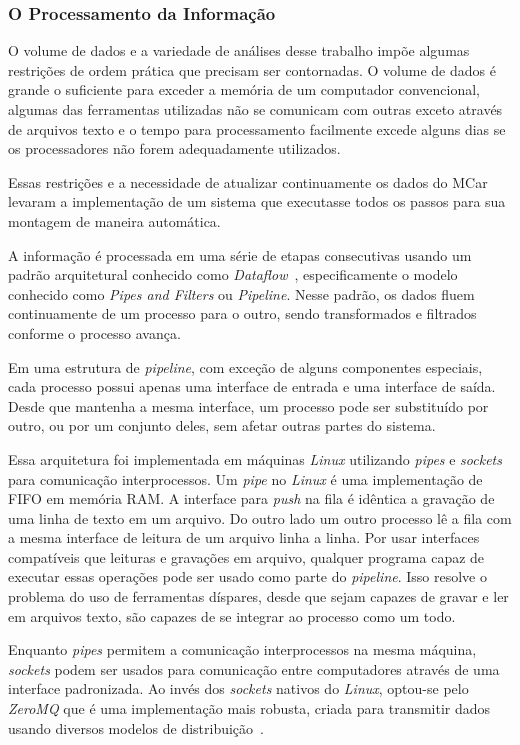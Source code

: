 \documentclass[12pt,a4paper,final]{article}
\begin{document}
\subsubsection{O Processamento da Informação}

O volume de dados e a variedade de análises desse trabalho impõe algumas restrições de ordem prática que precisam ser contornadas. O volume de dados é grande o suficiente para exceder a memória de um computador convencional, algumas das ferramentas utilizadas não se comunicam com outras exceto através de arquivos texto e o tempo para processamento facilmente excede alguns dias se os processadores não forem adequadamente utilizados.

Essas restrições e a necessidade de atualizar continuamente os dados do MCar levaram a implementação de um sistema que executasse todos os passos para sua montagem de maneira automática.

A informação é processada em uma série de etapas consecutivas usando um padrão arquitetural conhecido como \textit{Dataflow}~\cite{Carkci2014-jk, Hohpe2003-nj}, especificamente o modelo conhecido como \textit{Pipes and Filters} ou \textit{Pipeline}. Nesse padrão, os dados fluem continuamente de um processo para o outro, sendo transformados e filtrados conforme o processo avança. 

Em uma estrutura de \textit{pipeline}, com exceção de alguns componentes especiais, cada processo possui apenas uma interface de entrada e uma interface de saída. Desde que mantenha a mesma interface, um processo pode ser substituído por outro, ou por um conjunto deles, sem afetar outras partes do sistema.

Essa arquitetura foi implementada em máquinas \textit{Linux} utilizando \textit{pipes} e \textit{sockets} para comunicação interprocessos. Um \textit{pipe} no \textit{Linux} é uma implementação de FIFO em memória RAM. A interface para \textit{push} na fila é idêntica a gravação de uma linha de texto em um arquivo. Do outro lado um outro processo lê a fila com a mesma interface de leitura de um arquivo linha a linha. Por usar interfaces compatíveis que leituras e gravações em arquivo, qualquer programa capaz de executar essas operações pode ser usado como parte do \textit{pipeline}. Isso resolve o problema do uso de ferramentas díspares, desde que sejam capazes de gravar e ler em arquivos texto, são capazes de se integrar ao processo como um todo.

Enquanto \textit{pipes} permitem a comunicação interprocessos na mesma máquina, \textit{sockets} podem ser usados para comunicação entre computadores através de uma interface padronizada. Ao invés dos \textit{sockets} nativos do \textit{Linux}, optou-se pelo \textit{ZeroMQ} que é uma implementação mais robusta, criada para transmitir dados usando diversos modelos de distribuição~\cite{Hintjens2013-tz}.
\end{document}
